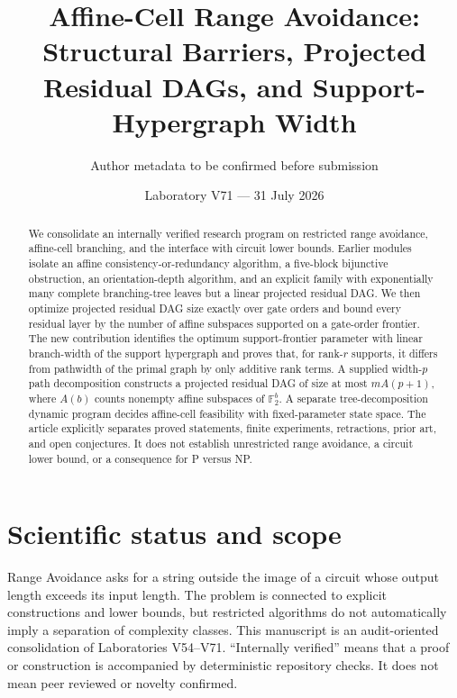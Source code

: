\documentclass[11pt]{article}
\title{Affine-Cell Range Avoidance: Structural Barriers, Projected Residual DAGs, and Support-Hypergraph Width}
\author{Author metadata to be confirmed before submission}
\date{Laboratory V71 --- 31 July 2026}
\newcommand{\Ftwo}{\mathbb F_2}
\begin{document}
\maketitle

\begin{abstract}
We consolidate an internally verified research program on restricted range avoidance, affine-cell branching, and the interface with circuit lower bounds.  Earlier modules isolate an affine consistency-or-redundancy algorithm, a five-block bijunctive obstruction, an orientation-depth algorithm, and an explicit family with exponentially many complete branching-tree leaves but a linear projected residual DAG.  We then optimize projected residual DAG size exactly over gate orders and bound every residual layer by the number of affine subspaces supported on a gate-order frontier.  The new contribution identifies the optimum support-frontier parameter with linear branch-width of the support hypergraph and proves that, for rank-$r$ supports, it differs from pathwidth of the primal graph by only additive rank terms.  A supplied width-$p$ path decomposition constructs a projected residual DAG of size at most $mA(p+1)$, where $A(b)$ counts nonempty affine subspaces of $\Ftwo^b$.  A separate tree-decomposition dynamic program decides affine-cell feasibility with fixed-parameter state space.  The article explicitly separates proved statements, finite experiments, retractions, prior art, and open conjectures.  It does not establish unrestricted range avoidance, a circuit lower bound, or a consequence for P versus NP.
\end{abstract}

\section{Scientific status and scope}
Range Avoidance asks for a string outside the image of a circuit whose output length exceeds its input length.  The problem is connected to explicit constructions and lower bounds, but restricted algorithms do not automatically imply a separation of complexity classes.  This manuscript is an audit-oriented consolidation of Laboratories V54--V71.  ``Internally verified'' means that a proof or construction is accompanied by deterministic repository checks.  It does not mean peer reviewed or novelty confirmed.
\end{document}
